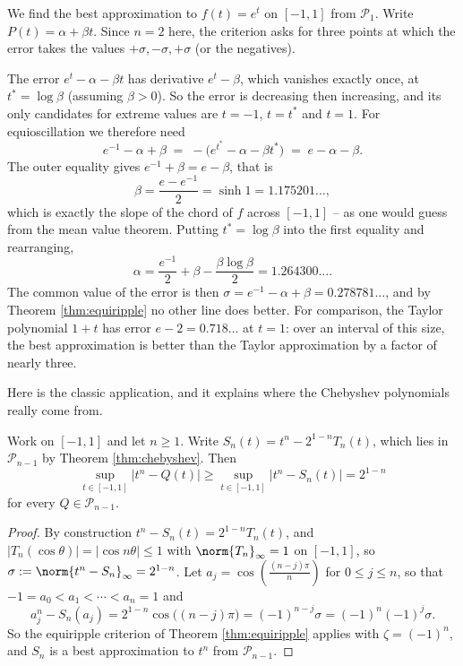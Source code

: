 \documentclass[a4paper]{scrartcl}
\newcommand{\Pn}{\mathcal{P}}
\begin{document}
\begin{example}
	We find the best approximation to $f(t) = e^t$ on $[-1,1]$ from $\Pn_1$. Write $P(t) = \alpha+\beta t$. Since $n = 2$ here, the criterion asks for three points at which the error takes the values $+\sigma,-\sigma,+\sigma$ (or the negatives).

	The error $e^t - \alpha-\beta t$ has derivative $e^t - \beta$, which vanishes exactly once, at $t^* = \log\beta$ (assuming $\beta>0$). So the error is decreasing then increasing, and its only candidates for extreme values are $t = -1$, $t = t^*$ and $t=1$. For equioscillation we therefore need
	$$e^{-1}-\alpha+\beta \;=\; -\big(e^{t^*}-\alpha-\beta t^*\big) \;=\; e - \alpha-\beta.$$
	The outer equality gives $e^{-1}+\beta = e - \beta$, that is
	$$\beta = \frac{e-e^{-1}}{2} = \sinh 1 = 1.175201\ldots,$$
	which is exactly the slope of the chord of $f$ across $[-1,1]$ -- as one would guess from the mean value theorem. Putting $t^*=\log\beta$ into the first equality and rearranging,
	$$\alpha = \frac{e^{-1}}{2}+\beta-\frac{\beta\log\beta}{2} = 1.264300\ldots.$$
	The common value of the error is then $\sigma = e^{-1}-\alpha+\beta = 0.278781\ldots$, and by Theorem \ref{thm:equiripple} no other line does better. For comparison, the Taylor polynomial $1+t$ has error $e-2 = 0.718\ldots$ at $t=1$: over an interval of this size, the best approximation is better than the Taylor approximation by a factor of nearly three.
\end{example}

Here is the classic application, and it explains where the Chebyshev polynomials really come from.

\begin{theorem}\label{thm:best-approx-tn}
	Work on $[-1,1]$ and let $n\geq1$. Write $S_n(t) = t^n - 2^{1-n}T_n(t)$, which lies in $\Pn_{n-1}$ by Theorem \ref{thm:chebyshev}. Then
	$$\sup_{t\in[-1,1]}|t^n - Q(t)| \geq \sup_{t\in[-1,1]}|t^n-S_n(t)| = 2^{1-n}$$
	for every $Q\in\Pn_{n-1}$.
\end{theorem}

\begin{proof}
	By construction $t^n - S_n(t) = 2^{1-n}T_n(t)$, and $|T_n(\cos\theta)| = |\cos n\theta|\leq1$ with $\norm{T_n}_\infty=1$ on $[-1,1]$, so $\sigma := \norm{t^n - S_n}_\infty = 2^{1-n}$. Let $a_j = \cos\left(\frac{(n-j)\pi}{n}\right)$ for $0\leq j \leq n$, so that $-1 = a_0<a_1<\cdots<a_n = 1$ and
	$$a_j^n - S_n(a_j) = 2^{1-n}\cos\big((n-j)\pi\big) = (-1)^{n-j}\sigma = (-1)^n(-1)^j\sigma.$$
	So the equiripple criterion of Theorem \ref{thm:equiripple} applies with $\zeta = (-1)^n$, and $S_n$ is a best approximation to $t^n$ from $\Pn_{n-1}$.
\end{proof}
\end{document}
